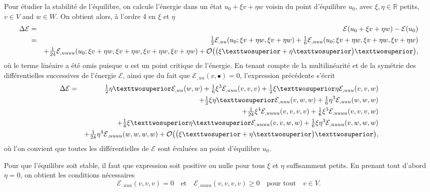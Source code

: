 \documentclass[12pt, final]{amsart}
\begin{document}
Pour étudier la stabilité de l'équilibre, on calcule l'énergie dans un état
\(u_0+\xi v+\eta w\) voisin du point d'équilibre \(u_0\), avec \(\xi , \eta \in\mathbb R \)
\guillemotleft{}petits\guillemotright{}, \(v\in V\) and \(w\in W\). On obtient alors,
à l'ordre 4 en \(\xi \) et \(\eta \)
\begin{eqnarray}
  \notag
  \Delta \mathcal E&=&\mathcal E(u_0+\xi v+\eta w)-\mathcal E(u_0)\\
  \notag
    &=&\tfrac12\mathcal E_{,uu}(u_0;\xi v+\eta w, \xi v+\eta w)
    +\tfrac16\mathcal E_{,uuu}(u_0;\xi v+\eta w, \xi v+\eta w, \xi v+\eta w)\\
    &&+\tfrac1{24}\mathcal E_{,uuuu}(u_0;\xi v+\eta w, \xi v+\eta w, \xi v+\eta w, \xi v+\eta w)
    +\mathcal{O}\bigl(\bigl(\xi ²+\eta ²\bigr)²\bigr),
\end{eqnarray}
où le terme linéaire a été omis puisque \(u\) est un point critique de
l'énergie. En tenant compte de la multilinéarité et de la symétrie des
différentielles successives de l'énergie \(\mathcal E\), ainsi que du fait que
\(\mathcal E_{,uu}(v, \bullet )=0\), l'expression précédente s'écrit
\begin{eqnarray}
  \notag
    \Delta \mathcal E&=&\tfrac12\eta ²\mathcal E_{,uu}(w, w)+\tfrac16\xi ^3\mathcal E_{,uuu}(v, v, v)
          +\tfrac12\xi ²\eta \mathcal E_{,uuu}(v, v, w)\\
  \notag
      &&+\tfrac12\xi \eta ²\mathcal E_{,uuu}(v, w, w)+\tfrac16\eta ^3\mathcal E_{,uuu}(w, w, w)\\
  \notag
      &&+\tfrac1{24}\xi ^4\mathcal E_{,uuuu}(v, v, v, v)+\tfrac16\xi ^3\mathcal E_{,uuuu}(v, v, v, w)\\
  \notag
      &&+\tfrac14\xi ²\eta ²\mathcal E_{,uuuu}(v, v, w, w)+\tfrac16\xi \eta ^3\mathcal E_{,uuuu}(v, w, w, w)\\
    &&+\tfrac1{24}\eta ^4\mathcal E_{,uuuu}(w, w, w, w)+\mathcal{O}\bigl(\bigl(\xi ²+\eta ²\bigr)²\bigr),
\end{eqnarray}
où l'on convient que toutes les différentielles de \(\mathcal E\) sont évaluées au point
d'équilibre \(u_0\).

Pour que l'équilibre soit stable, il faut que expression soit positive ou nulle
pour tous \(\xi \) et \(\eta \) suffisamment petits. En prenant tout d'abord \(\eta =0\),
on obtient les conditions nécessaires
\begin{equation}
  \label{eq:20211108164416}
  \mathcal E_{,uuu}(v, v, v)=0\quad\text{et}\quad\mathcal E_{,uuuu}(v, v, v, v)\geq0
  \quad\text{pour tout}\quad v\in V.
\end{equation}
\end{document}
